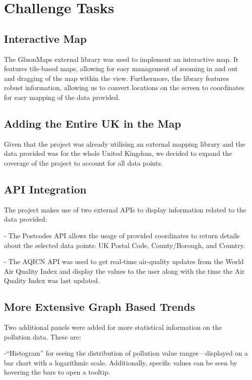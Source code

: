 \section{Challenge Tasks}
\subsection{Interactive Map}
The GluonMaps external library was used to implement an interactive map. It features tile-based maps, allowing for easy management of zooming in and out and dragging of the map within the view. Furthermore, the library features robust information, allowing us to convert locations on the screen to coordinates for easy mapping of the data provided.
    
\subsection{Adding the Entire UK in the Map}
Given that the project was already utilising an external mapping library and the data provided was for the whole United Kingdom, we decided to expand the coverage of the project to account for all data points.
    
\subsection{API Integration}
The project makes use of two external APIs to display information related to the data provided:
    
    - The Postcodes API allows the usage of provided coordinates to return details about the selected data points: UK Postal Code, County/Borough, and Country. 
    
    - The AQICN API was used to get real-time air-quality updates from the World Air Quality Index and display the values to the user along with the time the Air Quality Index was last updated.
    
\subsection{More Extensive Graph Based Trends}
Two additional panels were added for more statistical information on the pollution data. These are:

    -“Histogram” for seeing the distribution of pollution value ranges—displayed on a bar chart with a logarithmic scale. Additionally, specific values can be seen by hovering the bars to open a tooltip.
    
